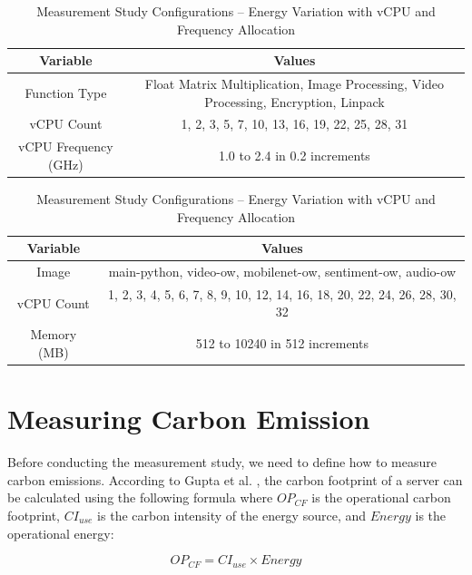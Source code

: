 \documentclass[times, 10pt,twocolumn]{article}
\begin{document}
\begin{table}[htbp]
   \centering
   \begin{tabular}{|c|c|}
   \hline
   \textbf{Variable} & \textbf{Values} \\ \hline
   Function Type & Float Matrix Multiplication, Image Processing, Video Processing, Encryption, Linpack \\ \hline
   vCPU Count & 1, 2, 3, 5, 7, 10, 13, 16, 19, 22, 25, 28, 31 \\ \hline
   vCPU Frequency (GHz) & 1.0 to 2.4 in 0.2 increments\\ \hline
   \end{tabular}
   \caption{Measurement Study Configurations -- Energy Variation with vCPU and Frequency Allocation}
   \label{tab:mstudy1_configurations}
\end{table}

\begin{table}[htbp]
  \centering
  \begin{tabular}{|c|c|}
  \hline
  \textbf{Variable} & \textbf{Values} \\ \hline
  Image & main-python, video-ow, mobilenet-ow, sentiment-ow, audio-ow \\ \hline
  vCPU Count & 1, 2, 3, 4, 5, 6, 7, 8, 9, 10, 12, 14, 16, 18, 20, 22, 24, 26, 28, 30, 32 \\ \hline
  Memory (MB) & 512 to 10240 in 512 increments\\ \hline
  \end{tabular}
  \caption{Measurement Study Configurations -- Energy Variation with vCPU and Frequency Allocation}
  \label{tab:mstudy1_configurations}
\end{table}

\section{Measuring Carbon Emission}


Before conducting the measurement study, we need to define how to measure carbon emissions. According to Gupta et al. \cite{gupta2022act}, the carbon footprint of a server can be calculated using the following formula where $OP_{CF}$ is the operational carbon footprint, $CI_{use}$ is the carbon intensity of the energy source, and $Energy$ is the operational energy:

\begin{equation}
   OP_{CF} = CI_{use} \times Energy
\end{equation}
\end{document}
